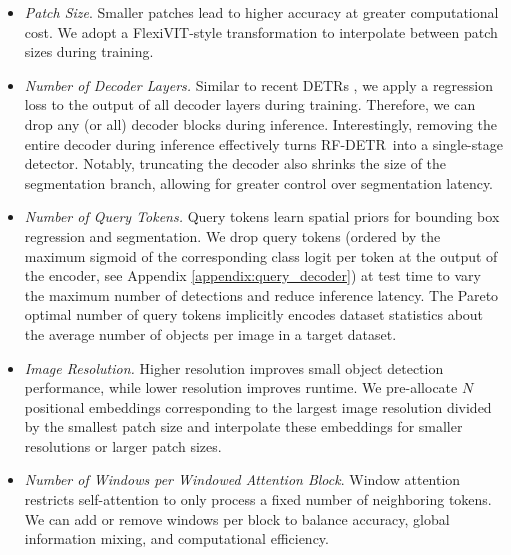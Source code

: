 \documentclass{article} %
\newcommand\isaac[1]{\textcolor{purered}{[Isaac: #1]}}
\newcommand{\method}{RF-DETR}
\begin{document}
\begin{itemize}
  \item  \textit{Patch Size}. Smaller patches lead to higher accuracy at greater computational cost. We adopt a FlexiVIT-style \citep{beyer2023flexivit} transformation to interpolate between patch sizes during training. 

  \item  \textit{Number of Decoder Layers.} Similar to recent DETRs \citep{peng2024dfine, zhao2024rtdetr}, we apply a regression loss to the output of all decoder layers during training. Therefore, we can drop any (or all) decoder blocks during inference. Interestingly, removing the entire decoder during inference effectively turns \method \ into a single-stage detector. Notably, truncating the decoder also shrinks the size of the segmentation branch, allowing for greater control over segmentation latency.%

  \item  \textit{Number of Query Tokens.} Query tokens learn spatial priors for bounding box regression and segmentation. We drop query tokens (ordered by the maximum sigmoid of the corresponding class logit per token at the output of the encoder, see Appendix \ref{appendix:query_decoder}) at test time to vary the maximum number of detections and reduce inference latency. The Pareto optimal number of query tokens implicitly encodes dataset statistics about the average number of objects per image in a target dataset. 
  
  \item  \textit{Image Resolution.} Higher resolution improves small object detection performance, while lower resolution improves runtime. We pre-allocate $N$ positional embeddings corresponding to the largest image resolution divided by the smallest patch size and interpolate these embeddings for smaller resolutions or larger patch sizes. 
    
  \item  \textit{Number of Windows per Windowed Attention Block}. Window attention restricts self-attention to only process a fixed number of neighboring tokens. We can add or remove windows per block to balance accuracy, global information mixing,  and computational efficiency.
\end{itemize}
\end{document}
